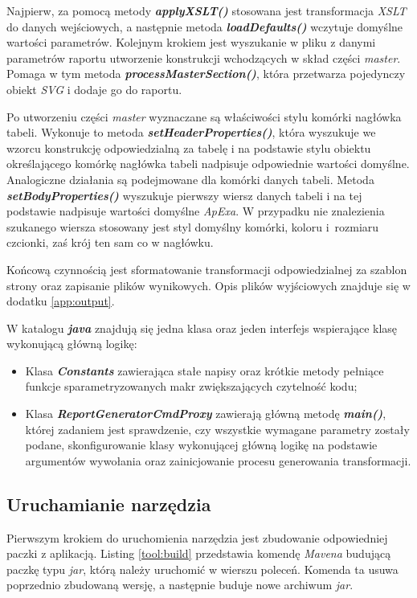 \documentclass[11pt,a4paper]{article}
\begin{document}
Najpierw, za pomocą metody \emph{\textbf{applyXSLT()}} stosowana jest transformacja \emph{XSLT} do danych wejściowych, a następnie metoda \emph{\textbf{loadDefaults()}} wczytuje domyślne wartości parametrów. Kolejnym krokiem jest wyszukanie w pliku z danymi parametrów raportu utworzenie konstrukcji wchodzących w skład części \emph{master}. Pomaga w tym metoda \emph{\textbf{processMasterSection()}}, która przetwarza pojedynczy obiekt \emph{SVG} i dodaje go do raportu. 

Po utworzeniu części \emph{master} wyznaczane są właściwości stylu komórki nagłówka tabeli. Wykonuje to metoda \emph{\textbf{setHeaderProperties()}}, która wyszukuje we wzorcu konstrukcję odpowiedzialną za tabelę i na podstawie stylu obiektu określającego komórkę nagłówka tabeli nadpisuje odpowiednie wartości domyślne. Analogiczne działania są podejmowane dla komórki danych tabeli. Metoda \emph{\textbf{setBodyProperties()}} wyszukuje pierwszy wiersz danych tabeli i na tej podstawie nadpisuje wartości domyślne \emph{ApExa}. W przypadku nie znalezienia szukanego wiersza stosowany jest styl domyślny komórki, koloru i~rozmiaru czcionki, zaś krój ten sam co w nagłówku. 

Końcową czynnością jest sformatowanie transformacji odpowiedzialnej za szablon strony oraz zapisanie plików wynikowych. Opis plików wyjściowych znajduje się w dodatku \ref{app:output}.

W katalogu \emph{\textbf{java}} znajdują się jedna klasa oraz jeden interfejs wspierające klasę wykonującą główną logikę:
\begin{itemize}
	\item Klasa \emph{\textbf{Constants}} zawierająca stałe napisy oraz krótkie metody pełniące funkcje sparametryzowanych makr zwiększających czytelność kodu;
	\item Klasa \emph{\textbf{ReportGeneratorCmdProxy}} zawierają główną metodę \emph{\textbf{main()}}, której zadaniem jest sprawdzenie, czy wszystkie wymagane parametry zostały podane, skonfigurowanie klasy wykonującej główną logikę na podstawie argumentów wywołania oraz zainicjowanie procesu generowania transformacji.
\end{itemize}

\subsection{Uruchamianie narzędzia}\label{tool:running}
Pierwszym krokiem do uruchomienia narzędzia jest zbudowanie odpowiedniej paczki z aplikacją. Listing \ref{tool:build} przedstawia komendę \emph{Mavena} budującą paczkę typu \emph{jar}, którą należy uruchomić w wierszu poleceń. Komenda ta usuwa poprzednio zbudowaną wersję, a następnie buduje nowe archiwum \emph{jar}.
\end{document}
